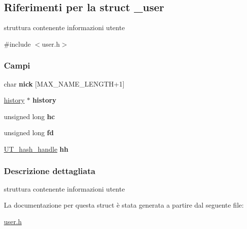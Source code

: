 \hypertarget{struct__user}{}\subsection{Riferimenti per la struct \+\_\+user}
\label{struct__user}


struttura contenente informazioni utente  




{\ttfamily \#include $<$user.\+h$>$}

\subsubsection*{Campi}
\begin{DoxyCompactItemize}
\item 
\mbox{\label{struct__user_a444473fcb564efcabdbeef3b8b85d4d7}} 
char {\bfseries nick} \mbox{[}M\+A\+X\+\_\+\+N\+A\+M\+E\+\_\+\+L\+E\+N\+G\+TH+1\mbox{]}
\item 
\mbox{\label{struct__user_ada3eb4657b644f8e6ed3f1f406aa0ddf}} 
\mbox{\hyperlink{struct__history}{history}} $\ast$ {\bfseries history}
\item 
\mbox{\label{struct__user_ac0bbbd9a76e49e6acedc61c881a4c4e6}} 
unsigned long {\bfseries hc}
\item 
\mbox{\label{struct__user_a728ab12545df8811f36edebeb887bad4}} 
unsigned long {\bfseries fd}
\item 
\mbox{\label{struct__user_a6447de419c8e48df0ac16ee782313922}} 
\mbox{\hyperlink{structUT__hash__handle}{U\+T\+\_\+hash\+\_\+handle}} {\bfseries hh}
\end{DoxyCompactItemize}


\subsubsection{Descrizione dettagliata}
struttura contenente informazioni utente 

La documentazione per questa struct è stata generata a partire dal seguente file\+:\begin{DoxyCompactItemize}
\item 
\mbox{\hyperlink{user_8h}{user.\+h}}\end{DoxyCompactItemize}
